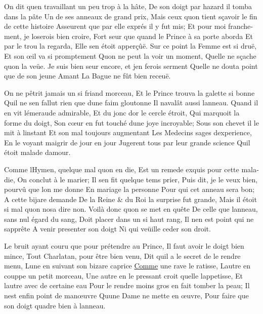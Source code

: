 \documentclass[14pt,a4paper]{memoir}
\newcommand{\ul}[1]{\uline{#1}}
\begin{document}
\begin{otherlanguage}{french}
{On dit qu\textquotesingle en travaillant un peu trop à la hâte, } {De
son doigt par hazard il tomba dans la pâte} {Un de ses anneaux de grand
prix,} {Mais ceux qu\textquotesingle on tient sçavoir le fin de cette
histoire} {Asseurent que par elle exprés il y fut mis;} {Et pour moi
franchement, je l\textquotesingle oserois bien croire,} {Fort seur que
quand le Prince à sa porte aborda } {Et par le trou la regarda,} {Elle
s\textquotesingle en étoit apperçûë.} {Sur ce point la Femme est si
druë,} {Et son œil va si promptement} {Qu\textquotesingle on ne peut la
voir un moment,} {Qu\textquotesingle elle ne sçache
qu\textquotesingle on l\textquotesingle a veüe.} {Je suis bien seur
encore, et j\textquotesingle en ferois serment }
{Qu\textquotesingle elle ne douta point que de son jeune Amant} {La
Bague ne fût bien receuë.}

{On ne pêtrit jamais un si friand morceau,} {Et le Prince trouva la
galette si bonne} {Qu\textquotesingle il ne s\textquotesingle en fallut
rien que d\textquotesingle une faim gloutonne} {Il
n\textquotesingle avalât aussi l\textquotesingle anneau.} {Quand il en
vit l\textquotesingle émeraude admirable,} {Et du jonc
d\textquotesingle or le cercle étroit,} {Qui marquoit la forme du
doigt,} {Son cœur en fut touché d\textquotesingle une joye incroyable;}
{Sous son chevet il le mit à l\textquotesingle instant} {Et son mal
toujours augmentant} {Les Medecins sages d\textquotesingle experience,}
{En le voyant maigrir de jour en jour} {Jugerent tous par leur grande
science} {Qu\textquotesingle il étoit malade d\textquotesingle amour.}

{Comme l\textquotesingle Hymen, quelque mal qu\textquotesingle on en
die,} {Est un remede exquis pour cette maladie,} {On conclut à le
marier;} {Il s\textquotesingle en fit quelque tems prier,} {Puis dit, je
le veux bien, pourvû que l\textquotesingle on me donne} {En mariage la
personne} {Pour qui cet anneau sera bon;} {A cette bijare demande} {De
la Reine \& du Roi la surprise fut grande, } {Mais il étoit si mal
qu\textquotesingle on n\textquotesingle osa dire non.} {Voilà donc
qu\textquotesingle on se met en quête} {De celle que
l\textquotesingle anneau, sans nul égard du sang,} {Doit placer dans un
si haut rang,} {Il n\textquotesingle en est point qui ne
s\textquotesingle apprête} {A venir presenter son doigt} {Ni qui veüille
ceder son droit.}

{Le bruit ayant couru que pour prétendre au Prince,} {Il faut avoir le
doigt bien mince,} {Tout Charlatan, pour être bien venu,} {Dit
qu\textquotesingle il a le secret de le rendre menu,}
{L\textquotesingle une en suivant son bizare caprice} {\ul{Comme} une
rave le ratisse,} {L\textquotesingle autre en couppe un petit morceau,}
{Une autre en le pressant croit qu\textquotesingle elle
l\textquotesingle appetisse,} {Et l\textquotesingle autre avec de
certaine eau} {Pour le rendre moins gros en fait tomber la peau; } { Il
n\textquotesingle est enfin point de manœuvre} {Qu\textquotesingle une
Dame ne mette en œuvre,} {Pour faire que son doigt quadre bien à
l\textquotesingle anneau. }


\end{otherlanguage}
\end{document}
